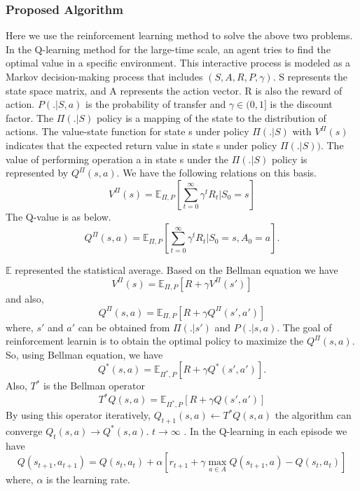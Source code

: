 \documentclass[conference]{IEEEtran}
\begin{document}
\subsubsection{Proposed Algorithm}
Here we use the reinforcement learning method to solve the above two problems.
In the Q-learning method for the large-time scale, an agent tries to find the optimal value in a specific environment. This interactive process is modeled as a Markov decision-making process that includes $ (S, A, R, P, \gamma) $.
S represents the state space matrix, and A represents the action vector. R is also the reward of action. $ P (. | S, a) $ is the probability of transfer and $ \gamma \in (0,1] $ is the discount factor.  The $ \Pi (. | S) $ policy is a mapping of the state to the distribution of actions. The value-state function for state s under policy $ \Pi (. | S) $ with $ V^{\Pi} (s) $ indicates that the expected return value in state s under policy $ \Pi (. | S) ) $. The value of performing operation a in state s under the $ \Pi (. | S) $ policy is represented by $ Q ^ {\Pi} (s, a) $. We have the following relations on this basis.
\begin{equation}
	V^{\Pi}(s) = \mathbb{E}_{\Pi,P}[\sum_{t=0}^{\infty}\gamma^tR_t|S_0=s]
 \end{equation}
 The Q-value is as below.
 \begin{equation}
	Q^{\Pi}(s,a) = \mathbb{E}_{\Pi,P}[\sum_{t=0}^{\infty}\gamma^tR_t|S_0=s,A_0=a].
\end{equation}
 
  $\mathbb{E}$ represented the statistical average. 
 Based on the Bellman equation we have
 \begin{equation}
	V^{\Pi}(s) = \mathbb{E}_{\Pi,P}[R+\gamma V^{\Pi}(s')]
\end{equation}  
 and also, 
   \begin{equation}
  	Q^{\Pi}(s,a) = \mathbb{E}_{\Pi,P}[R+\gamma Q^{\Pi}(s',a')]
  \end{equation}  
  where, $s'$ and $a'$ can be obtained from $\Pi(.|s')$ and $P(.|s,a)$.
The goal of reinforcement learnin is to obtain the optimal policy to maximize the $Q^{\Pi}(s,a)$.
So, using Bellman equation, we have
\begin{equation}
	Q^{*}(s,a) = \mathbb{E}_{\Pi^*,P}[R+\gamma Q^{*}(s',a')].
\end{equation} 
Also, $T^*$ is the Bellman operator
\begin{equation}
	T^{*}Q(s,a) = \mathbb{E}_{\Pi^*,P}[R+\gamma Q(s',a')]
\end{equation} 
By using this operator iteratively, 
$Q_{t+1}(s,a) \leftarrow T^{*}Q(s,a) $
the algorithm can converge
$Q_{t}(s,a) \rightarrow Q^*(s,a)$.
 $t \rightarrow \infty $
\cite{montague1999reinforcement,gan1}.
In the Q-learning in each episode we have
\begin{equation}
	Q(s_{t+1},a_{t+1}) = Q(s_t,a_t)+\alpha[ r_{t+1} + \gamma \max_{a \in A}{Q(s_{t+1},a)}-Q(s_t,a_t)]
\end{equation}
where, $\alpha$ is the learning rate.



\end{document}
